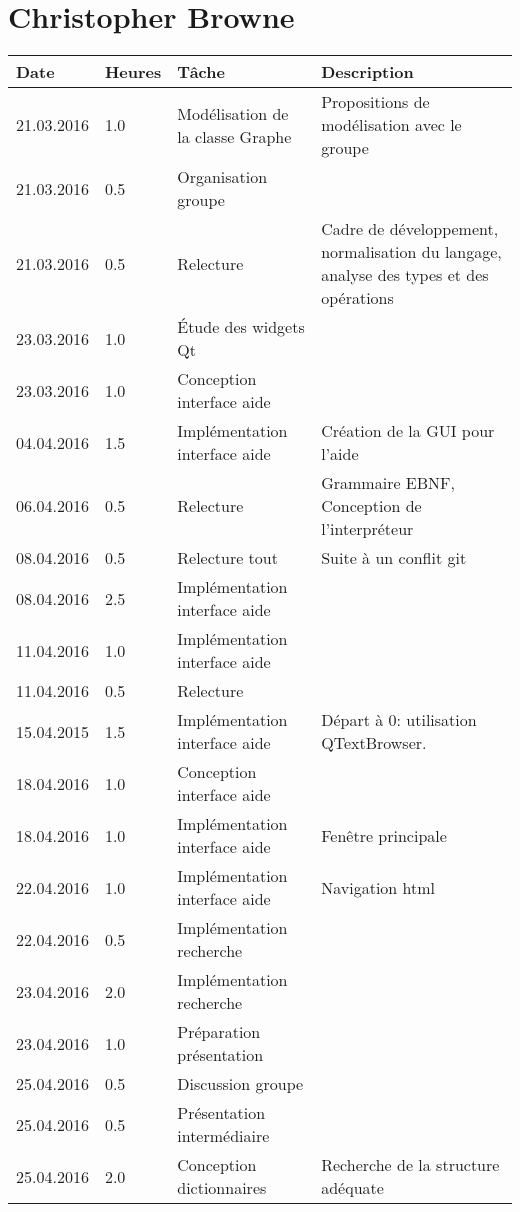 \documentclass[french]{article}
\begin{document}
	\section*{Christopher Browne}
	\begin{tabular}{p{}|p{}|p{}|p{}}
		Date&Heures&Tâche&Description\\
		\hline \hline
		21.03.2016 & 1.0 & Modélisation de la classe Graphe & Propositions de modélisation avec le groupe \\
		21.03.2016 & 0.5 & Organisation groupe & \\
		21.03.2016 & 0.5 & Relecture & Cadre de développement, normalisation du langage, analyse des types et des opérations \\
		23.03.2016 & 1.0 & Étude des widgets Qt & \\
		23.03.2016 & 1.0 & Conception interface aide\\
		\hline
		04.04.2016 & 1.5 & Implémentation interface aide & Création de la GUI pour l'aide \\
		06.04.2016 & 0.5 & Relecture & Grammaire EBNF, Conception de l'interpréteur\\
		08.04.2016 & 0.5 & Relecture tout & Suite à un conflit git\\
		08.04.2016 & 2.5 & Implémentation interface aide & \\
		\hline
		11.04.2016 & 1.0 & Implémentation interface aide & \\
		11.04.2016 & 0.5 & Relecture & \\
		15.04.2015 & 1.5 & Implémentation interface aide & Départ à 0: utilisation QTextBrowser.\\
		\hline
		18.04.2016 & 1.0 & Conception interface aide & \\
		18.04.2016 & 1.0 & Implémentation interface aide & Fenêtre principale\\
		22.04.2016 & 1.0 & Implémentation interface aide & Navigation html\\
		22.04.2016 & 0.5 & Implémentation recherche & \\
		23.04.2016 & 2.0 & Implémentation recherche & \\
		23.04.2016 & 1.0 & Préparation présentation & \\
		\hline
		25.04.2016 & 0.5 & Discussion groupe & \\
		25.04.2016 & 0.5 & Présentation intermédiaire & \\
		25.04.2016 & 2.0 & Conception dictionnaires & Recherche de la structure adéquate\\

\end{tabular}
\end{document}

